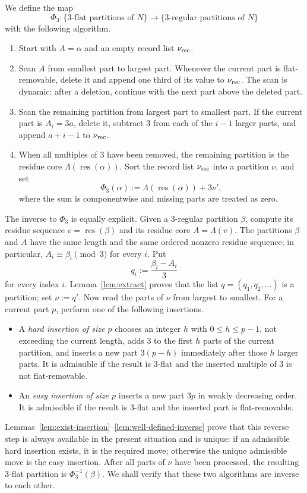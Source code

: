 \documentclass[11pt]{amsart}
\theoremstyle{definition}
\theoremstyle{remark}
\newcommand{\res}{\operatorname{res}}
\begin{document}
We define the map
\begin{equation}
       \Phi_3:\{3\text{-flat partitions of }N\}
       \longrightarrow
       \{3\text{-regular partitions of }N\}
\end{equation}
with the following  algorithm.
\begin{enumerate}[label=\textbf{S\arabic*.},leftmargin=3.1em]
\item Start with $A=\alpha$ and an empty record list $\nu_{\rm rec}$.
\item Scan $A$ from smallest part to largest part.  Whenever the current part is flat-removable, delete it and append one third of its value to $\nu_{\rm rec}$.  The scan is dynamic: after a deletion, continue with the next part above the deleted part.
\item Scan the remaining partition from largest part to smallest part.  If the current part is $A_i=3a$, delete it, subtract $3$ from each of the $i-1$ larger parts, and append $a+i-1$ to $\nu_{\rm rec}$.
\item When all multiples of $3$ have been removed, the remaining partition is the residue core $\Lambda(\res(\alpha))$.  Sort the record list $\nu_{\rm rec}$ into a partition $\nu$, and set
\[
        \Phi_3(\alpha):=\Lambda(\res(\alpha))+3\nu',
\]
where the sum is componentwise and missing parts are treated as zero.
\end{enumerate}

The inverse to $\Phi_3$ is equally explicit.  Given a $3$-regular partition $\beta$, compute its residue sequence $v=\res(\beta)$ and its residue core $A=\Lambda(v)$.  The partitions $\beta$ and $A$ have the same length and the same ordered nonzero residue sequence; in particular, $A_i\equiv\beta_i\pmod3$ for every $i$.  Put
\[
        q_i:=\frac{\beta_i-A_i}{3}
\]
for every index $i$.  Lemma~\ref{lem:extract} proves that the list $q=(q_1,q_2,\ldots)$ is a partition; set $\nu:=q'$.  Now read the parts of $\nu$ from largest to smallest.  For a current part $p$, perform one of the following insertions.
\begin{itemize}[leftmargin=2.4em]
\item A \emph{hard insertion of size $p$} chooses an integer $h$ with $0\le h\le p-1$, not exceeding the current length, adds $3$ to the first $h$ parts of the current partition, and inserts a new part $3(p-h)$ immediately after those $h$ larger parts.  It is admissible if the result is $3$-flat and the inserted multiple of $3$ is not flat-removable.
\item An \emph{easy insertion of size $p$} inserts a new part $3p$ in weakly decreasing order.  It is admissible if the result is $3$-flat and the inserted part is flat-removable.
\end{itemize}
Lemmas~\ref{lem:exist-insertion}--\ref{lem:well-defined-inverse} prove that this reverse step is always available in the present situation and is unique: if an admissible hard insertion exists, it is the required move; otherwise the unique admissible move is the easy insertion.  After all parts of $\nu$ have been processed, the resulting $3$-flat partition is $\Phi_3^{-1}(\beta)$.  We shall verify that these two algorithms are inverse to each other.
\end{document}
